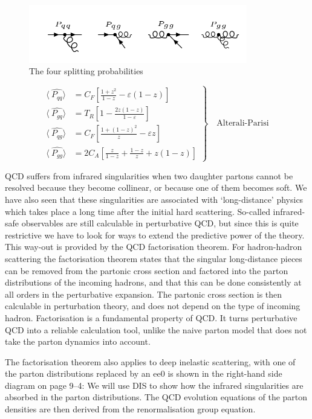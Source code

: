 \begin{figure}[h!]
\centering
\includegraphics[width=0.85\textwidth]{images/Intro/spiliting.png}
\caption{The four splitting probabilities}
\label{splitting}
\end{figure}

\begin{equation}
	\left.\begin{aligned}
\langle\:\hat{P_{qq}}\rangle &= C_F[\frac{1+z^2}{1-z}-\varepsilon(1-z)]\\
\langle\:\hat{P_{gq}}\rangle &= T_R[1-\frac{2z(1-z)}{1-\varepsilon}]\\
\langle\:\hat{P_{qg}}\rangle &= C_F[\frac{1+(1-z)^2}{z}-\varepsilon z]\\
\langle\:\hat{P_{gg}}\rangle &= 2C_A[\frac{z}{1-z}+\frac{1-z}{z}+z(1-z)]
\end{aligned}
	\right\}
	\quad \text{Alterali-Parisi
	}
\label{Alterali-Parisi}
\end{equation}


QCD suffers from infrared singularities
when two daughter partons cannot be resolved because they
become collinear, or because one of them becomes soft. We have also seen that these singularities are associated with ‘long-distance’ physics which takes place a long time after the initial hard scattering.
So-called infrared-safe observables are still calculable in perturbative QCD, but since this is quite restrictive we have to look for ways to extend the predictive power of the theory. This way-out is provided by the QCD factorisation theorem. For hadron-hadron scattering the factorisation theorem states that the singular long-distance pieces can be removed from the partonic
cross section and factored into the parton distributions of the incoming hadrons, and that this can be done consistently at all orders in the perturbative expansion.
The partonic cross section is then calculable in perturbation theory,
and does not depend on the type of incoming hadron. Factorisation is a fundamental property of QCD. It turns perturbative
QCD into a reliable calculation tool, unlike the naive parton
model that does not take the parton dynamics into account.

The factorisation theorem also applies to deep inelastic scattering,
with one of the parton distributions replaced by an ee0%
is shown in the right-hand side diagram on page 9–4:
We will use DIS to show how the infrared singularities are absorbed
in the parton distributions. The QCD evolution equations
of the parton densities are then derived from the renormalisation
group equation.
\newpage